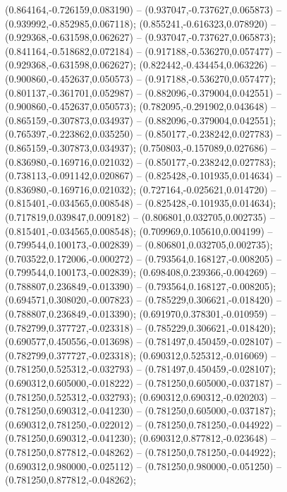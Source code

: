  (0.864164,-0.726159,0.083190) -- (0.937047,-0.737627,0.065873) -- (0.939992,-0.852985,0.067118);
 (0.855241,-0.616323,0.078920) -- (0.929368,-0.631598,0.062627) -- (0.937047,-0.737627,0.065873);
 (0.841164,-0.518682,0.072184) -- (0.917188,-0.536270,0.057477) -- (0.929368,-0.631598,0.062627);
 (0.822442,-0.434454,0.063226) -- (0.900860,-0.452637,0.050573) -- (0.917188,-0.536270,0.057477);
 (0.801137,-0.361701,0.052987) -- (0.882096,-0.379004,0.042551) -- (0.900860,-0.452637,0.050573);
 (0.782095,-0.291902,0.043648) -- (0.865159,-0.307873,0.034937) -- (0.882096,-0.379004,0.042551);
 (0.765397,-0.223862,0.035250) -- (0.850177,-0.238242,0.027783) -- (0.865159,-0.307873,0.034937);
 (0.750803,-0.157089,0.027686) -- (0.836980,-0.169716,0.021032) -- (0.850177,-0.238242,0.027783);
 (0.738113,-0.091142,0.020867) -- (0.825428,-0.101935,0.014634) -- (0.836980,-0.169716,0.021032);
 (0.727164,-0.025621,0.014720) -- (0.815401,-0.034565,0.008548) -- (0.825428,-0.101935,0.014634);
 (0.717819,0.039847,0.009182) -- (0.806801,0.032705,0.002735) -- (0.815401,-0.034565,0.008548);
 (0.709969,0.105610,0.004199) -- (0.799544,0.100173,-0.002839) -- (0.806801,0.032705,0.002735);
 (0.703522,0.172006,-0.000272) -- (0.793564,0.168127,-0.008205) -- (0.799544,0.100173,-0.002839);
 (0.698408,0.239366,-0.004269) -- (0.788807,0.236849,-0.013390) -- (0.793564,0.168127,-0.008205);
 (0.694571,0.308020,-0.007823) -- (0.785229,0.306621,-0.018420) -- (0.788807,0.236849,-0.013390);
 (0.691970,0.378301,-0.010959) -- (0.782799,0.377727,-0.023318) -- (0.785229,0.306621,-0.018420);
 (0.690577,0.450556,-0.013698) -- (0.781497,0.450459,-0.028107) -- (0.782799,0.377727,-0.023318);
 (0.690312,0.525312,-0.016069) -- (0.781250,0.525312,-0.032793) -- (0.781497,0.450459,-0.028107);
 (0.690312,0.605000,-0.018222) -- (0.781250,0.605000,-0.037187) -- (0.781250,0.525312,-0.032793);
 (0.690312,0.690312,-0.020203) -- (0.781250,0.690312,-0.041230) -- (0.781250,0.605000,-0.037187);
 (0.690312,0.781250,-0.022012) -- (0.781250,0.781250,-0.044922) -- (0.781250,0.690312,-0.041230);
 (0.690312,0.877812,-0.023648) -- (0.781250,0.877812,-0.048262) -- (0.781250,0.781250,-0.044922);
 (0.690312,0.980000,-0.025112) -- (0.781250,0.980000,-0.051250) -- (0.781250,0.877812,-0.048262);
